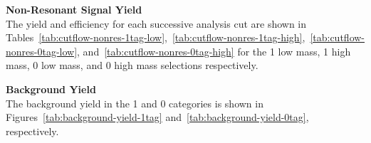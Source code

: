 

\noindent \textbf{Non-Resonant Signal Yield}\\
\indent The yield and efficiency for each successive analysis cut are shown in Tables~\ref{tab:cutflow-nonres-1tag-low},~\ref{tab:cutflow-nonres-1tag-high},~\ref{tab:cutflow-nonres-0tag-low}, and~\ref{tab:cutflow-nonres-0tag-high} for the 1 \btag low mass, 1 \btag high mass, 0 \btag low mass, and 0 \btag high mass selections respectively.







\noindent \textbf{Background Yield}\\
\indent The background yield in the 1 and 0 \btag categories is shown in Figures~\ref{tab:background-yield-1tag} and~\ref{tab:background-yield-0tag}, respectively.


